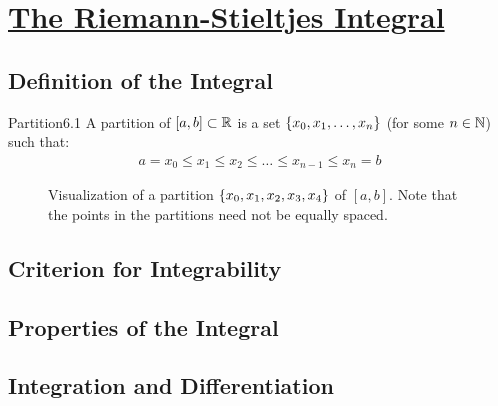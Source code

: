 \section[The Riemann-Stieltjes Integral]{\hyperlink{toc}{The Riemann-Stieltjes Integral}}

\subsection{Definition of the Integral}
\begin{definition}{Partition}{6.1}
    A partition of $[a, b] \subset \mathbb{R}$ is a set $\set{x_0, x_1, \ldots, x_n}$ (for some $n \in \mathbb{N}$) such that:
    \begin{align*}
        a = x_0 \leq x_1 \leq x_2 \leq \ldots \leq x_{n-1} \leq x_n = b
    \end{align*}
\end{definition}

\begin{figure}[htbp]
    \centering
    \caption{Visualization of a partition $\set{x_0, x_1, x_2, x_3, x_4}$ of $[a, b]$. Note that the points in the partitions need not be equally spaced.}
    \label{fig27}
\end{figure}

\subsection{Criterion for Integrability}

\subsection{Properties of the Integral}

\subsection{Integration and Differentiation}

